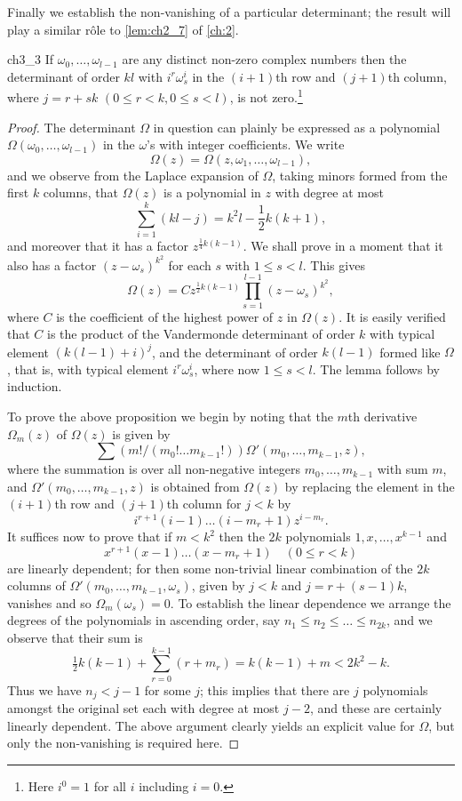 Finally we establish the non-vanishing of a particular determinant; the result will play a similar r\^ole to \autoref{lem:ch2_7} of \autoref{ch:2}.

\begin{mylemma}{}{ch3_3}
If $\omega_0, \dots, \omega_{l-1}$ are any distinct non-zero complex numbers then the determinant of order $kl$ with $i^r\omega_s^i$ in the $(i+1)$th row and $(j+1)$th column, where $j=r+sk$ $(0 \le r < k, 0 \le s < l)$, is not zero.\footnote{Here $i^0 = 1$ for all $i$ including $i = 0$.}
\end{mylemma}

\begin{proof}
The determinant $\Omega$ in question can plainly be expressed as a polynomial $\Omega(\omega_0, \dots, \omega_{l-1})$ in the $\omega$'s with integer coefficients. We write
\[
\Omega(z) = \Omega(z, \omega_1, \dots, \omega_{l-1}),
\]
and we observe from the Laplace expansion of $\Omega$, taking minors formed from the first $k$ columns, that $\Omega(z)$ is a polynomial in $z$ with degree at most
\[
\sum_{i=1}^k (kl - j) = k^2 l - \frac{1}{2} k(k+1),
\]
and moreover that it has a factor $z^{\frac{1}{4}k(k-1)}$. We shall prove in a moment that it also has a factor $(z-\omega_s)^{k^2}$ for each $s$ with $1 \le s < l$. This gives
\[
\Omega(z) = C z^{\frac{1}{2}k(k-1)} \prod_{s=1}^{l-1} (z - \omega_s)^{k^2},
\]
where $C$ is the coefficient of the highest power of $z$ in $\Omega(z)$. It is easily verified that $C$ is the product of the Vandermonde determinant of order $k$ with typical element $(k(l-1)+i)^j$, and the determinant of order $k(l-1)$ formed like $\Omega$, that is, with typical element $i^r\omega_s^i$, where now $1 \le s < l$. The lemma follows by induction.

To prove the above proposition we begin by noting that the $m$th derivative $\Omega_m(z)$ of $\Omega(z)$ is given by
\[
\sum (m!/(m_0! \dots m_{k-1}!))\Omega'(m_0, \dots, m_{k-1}, z),
\]
where the summation is over all non-negative integers $m_0, \dots, m_{k-1}$ with sum $m$, and $\Omega'(m_0, \dots, m_{k-1}, z)$ is obtained from $\Omega(z)$ by replacing the element in the $(i+1)$th row and $(j+1)$th column for $j < k$ by
\[
i^{r+1}(i-1)\dots(i-m_r+1)z^{i-m_r}.
\]
It suffices now to prove that if $m < k^2$ then the $2k$ polynomials $1, x, \dots, x^{k-1}$ and
\[
x^{r+1}(x-1)\dots(x-m_r+1) \quad (0 \le r < k)
\]
are linearly dependent; for then some non-trivial linear combination of the $2k$ columns of $\Omega'(m_0, \dots, m_{k-1}, \omega_s)$, given by $j < k$ and $j = r + (s-1)k$, vanishes and so $\Omega_m(\omega_s) = 0$. To establish the linear dependence we arrange the degrees of the polynomials in ascending order, say $n_1 \le n_2 \le \dots \le n_{2k}$, and we observe that their sum is
\[
\tfrac{1}{2}k(k-1) + \sum_{r=0}^{k-1} (r+m_r) = k(k-1) + m < 2k^2 - k.
\]
Thus we have $n_j < j-1$ for some $j$; this implies that there are $j$ polynomials amongst the original set each with degree at most $j-2$, and these are certainly linearly dependent. The above argument clearly yields an explicit value for $\Omega$, but only the non-vanishing is required here.
\end{proof}

